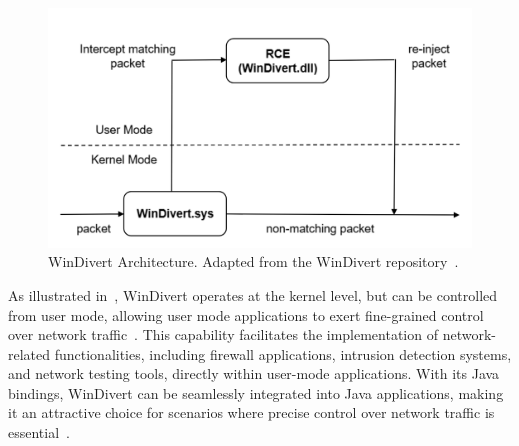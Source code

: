 \begin{figure}
    \centering
    \includegraphics[width=\linewidth]{files/figures/WinDivert.png}
    \caption{WinDivert Architecture. Adapted from the WinDivert repository~\cite{noauthor_windivert:_nodate}.}
    \label{fig:WinDivert}
\end{figure}

As illustrated in~, WinDivert operates at the kernel level, but can be controlled from user mode, allowing user mode applications to exert fine-grained control over network traffic~\cite{noauthor_windivert:_nodate}. This capability facilitates the implementation of network-related functionalities, including firewall applications, intrusion detection systems, and network testing tools, directly within user-mode applications. With its Java bindings, WinDivert can be seamlessly integrated into Java applications, making it an attractive choice for scenarios where precise control over network traffic is essential~\cite{noauthor_windivert:_nodate}.